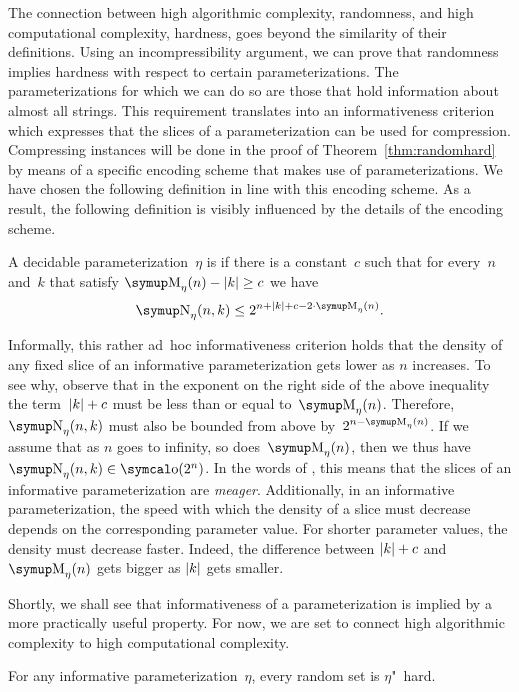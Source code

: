 The connection between high algorithmic complexity, randomness, and high computational complexity, hardness, goes beyond the similarity of their definitions.
Using an incompressibility argument, we can prove that randomness implies hardness with respect to certain parameterizations.
The parameterizations for which we can do so are those that hold information about almost all strings.
This requirement translates into an informativeness criterion which expresses that the slices of a parameterization can be used for compression.
Compressing instances will be done in the proof of Theorem~\ref{thm:randomhard} by means of a specific encoding scheme that makes use of parameterizations.
We have chosen the following definition in line with this encoding scheme.
As a result, the following definition is visibly influenced by the details of the encoding scheme.
\begin{definition}
\label{def:informative}%
  A decidable parameterization~$\eta$ is  if there is a constant~$c$ such that for every~$n$ and~$k$ that satisfy $\upM_\eta(n) - \length{k} \ge c$ we have
  \begin{equation*}
    \upN_\eta(n, k) \le 2^{n + \length{k} + c - 2 \cdot \upM_\eta(n)}.
  \end{equation*}
\end{definition}

Informally, this rather ad~hoc informativeness criterion holds that the density of any fixed slice of an informative parameterization gets lower as $n$ increases.
To see why, observe that in the exponent on the right side of the above inequality the term~${\lvert k\rvert} + c$ must be less than or equal to~$\upM_\eta(n)$.
Therefore, $\upN_\eta(n, k)$ must also be bounded from above by~$2^{n - \upM_\eta(n)}$.
If we assume that as $n$ goes to infinity, so does~$\upM_\eta(n)$, then we thus have~$\upN_\eta(n, k) \in \littleo(2^n)$.
In the words of \textcite[Example~2.2.6, attributed to Michael Sipser]{li2008introduction}, this means that the slices of an informative parameterization are \emph{meager}.
Additionally, in an informative parameterization, the speed with which the density of a slice must decrease depends on the corresponding parameter value.
For shorter parameter values, the density must decrease faster.
Indeed, the difference between ${\lvert k\rvert} + c$ and~$\upM_\eta(n)$ gets bigger as ${\lvert k\rvert}$ gets smaller.

Shortly, we shall see that informativeness of a parameterization is implied by a more practically useful property.
For now, we are set to connect high algorithmic complexity to high computational complexity.
\begin{theorem}
\label{thm:randomhard}%
  For any informative parameterization~$\eta$, every random set is $\eta$"~hard.
\end{theorem}

